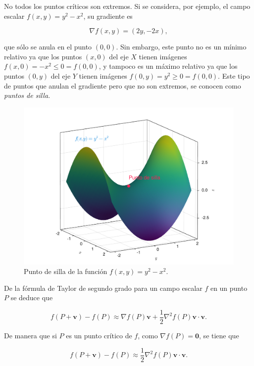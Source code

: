 \documentclass[
  a4paper,
]{scrreport}
\theoremstyle{definition}
\theoremstyle{plain}
\theoremstyle{plain}
\theoremstyle{definition}
\theoremstyle{definition}
\theoremstyle{plain}
\theoremstyle{remark}
\begin{document}
No todos los puntos críticos son extremos. Si se considera, por ejemplo,
el campo escalar \(f(x,y)=y^2-x^2\), su gradiente es

\[\nabla f(x,y) = (2y,-2x),\]

que sólo se anula en el punto \((0,0)\). Sin embargo, este punto no es
un mínimo relativo ya que los puntos \((x,0)\) del eje \(X\) tienen
imágenes \(f(x,0) = -x^2 \leq 0 = f(0,0)\), y tampoco es un máximo
relativo ya que los puntos \((0,y)\) del eje \(Y\) tienen imágenes
\(f(0,y)= y^2 \geq 0 = f(0,0)\). Este tipo de puntos que anulan el
gradiente pero que no son extremos, se conocen como \emph{puntos de
silla}.

\begin{figure}

{\centering \includegraphics{img/derivadas-funciones-varias-variables/punto-silla.pdf}

}

\caption{Punto de silla de la función \(f(x,y)=y^2-x^2\).}

\end{figure}

De la fórmula de Taylor de segundo grado para un campo escalar \(f\) en
un punto \(P\) se deduce que

\[
f(P+\mathbf{v})-f(P)\approx \nabla f(P)\mathbf{v}+\frac{1}{2}\nabla^2f(P)\mathbf{v}\cdot\mathbf{v}.
\]

De manera que si \(P\) es un punto crítico de \(f\), como
\(\nabla f(P)=\mathbf{0}\), se tiene que

\[
f(P+\mathbf{v})-f(P)\approx \frac{1}{2}\nabla^2f(P)\mathbf{v}\cdot\mathbf{v}.
\]
\end{document}
